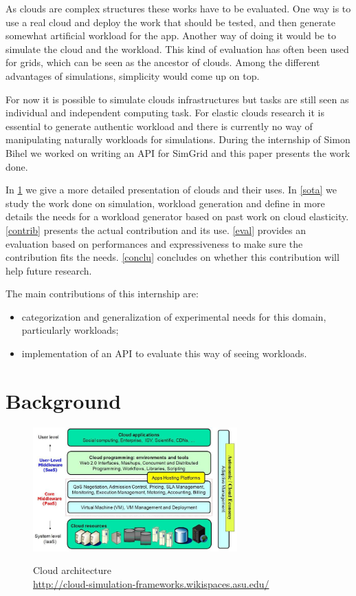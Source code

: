 \documentclass[a4paper, onecolumn]{article}
\begin{document}
  As clouds are complex structures these works have to be evaluated. One way is
  to use a real cloud and deploy the work that should be tested, and then
  generate somewhat artificial workload for the app. Another way of doing it
  would be to simulate the cloud and the workload. This kind of evaluation has
  often been used for grids, which can be seen as the ancestor of clouds. Among
  the different advantages of simulations, simplicity would come up on top.
  
  For now it is possible to simulate clouds infrastructures but tasks are still 
  seen as individual and independent computing task. For elastic clouds 
  research it is essential to generate authentic workload and there is 
  currently no way of manipulating naturally workloads for simulations. During 
  the internship of Simon Bihel we worked on writing an API for SimGrid and this
  paper presents the work done.
  
  In \ref{background} we give a more detailed presentation of clouds and their 
  uses. In \ref{sota} we study the work done on simulation, workload generation 
  and define in more details the needs for a workload generator based on past 
  work on cloud elasticity. \ref{contrib} presents the actual contribution and 
  its use. \ref{eval} provides an evaluation based on performances and 
  expressiveness to make sure the contribution fits the needs. \ref{conclu} 
  concludes on whether this contribution will help future research.
  
  The main contributions of this internship are:
  \begin{itemize}
  	\item categorization and generalization of experimental needs for this 
  	domain, particularly workloads;
  	\item implementation of an API to evaluate this way of seeing workloads.
  \end{itemize}


\section{Background} \label{background}
  \begin{figure}
    \caption{Cloud architecture \\ 
    \url{http://cloud-simulation-frameworks.wikispaces.asu.edu/}}
    \centering
    \includegraphics[width=0.7\textwidth]{../plots/cloud_architecture}
    \label{cloud_arch}
  \end{figure}
  
\end{document}
